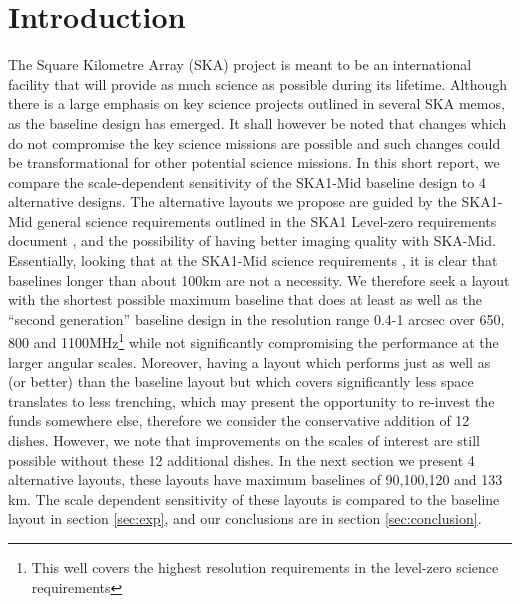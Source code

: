 \documentclass[sfheadings,a4paper,times,9pt,floats,floatfix]{article}
\begin{document}
\section{Introduction}
\vspace{-.1cm}
The Square Kilometre Array (SKA) project is meant to be an international facility that will provide as much science as possible
during its lifetime. Although there is a large emphasis on key science projects outlined in several SKA memos, as the baseline
design \cite{bd} has emerged. It shall however be noted that changes which do not compromise the key science missions are possible
and such changes could be transformational for other potential science missions. In this short report, we compare the
scale-dependent sensitivity of the SKA1-Mid baseline design to 4 alternative designs. The alternative layouts we propose are
guided by the SKA1-Mid general science requirements outlined in the SKA1 Level-zero requirements document \cite{srd}, and the
possibility of having better imaging quality with SKA-Mid. Essentially, looking that at the SKA1-Mid science requirements
\cite{srd}, it is clear that baselines longer than about 100km are not a necessity. We therefore seek a layout with the shortest
possible maximum baseline that does at least as well as the ``second generation'' baseline design in the resolution range 0.4-1
arcsec over 650, 800 and 1100MHz\footnote{This well covers the highest resolution requirements in the level-zero science
requirements} while not significantly compromising the performance at the larger angular scales. Moreover, having a layout which
performs just as well as (or better) than the baseline layout but which covers significantly less space translates to less
trenching, which may present the opportunity to re-invest the funds somewhere else, therefore we consider the conservative
addition of 12 dishes. However, we note that improvements on the scales of interest are still possible without these 12 additional
dishes. In the next section we present 4 alternative layouts, these layouts have maximum baselines of 90,100,120 and 133 km. The
scale dependent sensitivity of these layouts is compared to the baseline layout in section \ref{sec:exp}, and our conclusions are
in section \ref{sec:conclusion}.
\end{document}
